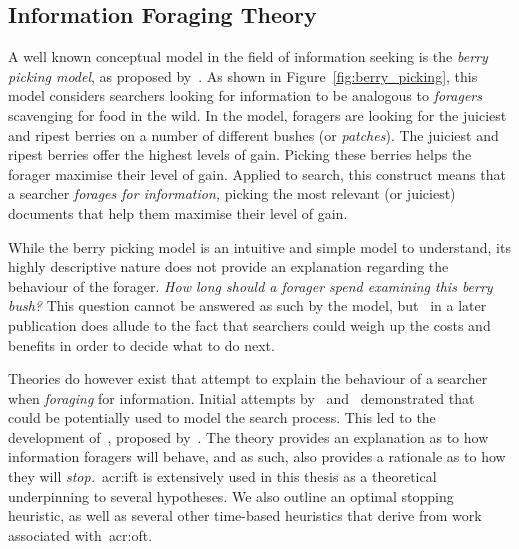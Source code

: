 \subsection{Information Foraging Theory}\label{sec:stopping_background:theoretical:ift}
A well known conceptual model in the field of information seeking is the \emph{berry picking model}, as proposed by~\cite{bates1989berry_picking}. As shown in Figure~\ref{fig:berry_picking}, this model considers searchers looking for information to be analogous to \emph{foragers} scavenging for food in the wild. In the model, foragers are looking for the juiciest and ripest berries on a number of different bushes (or \emph{patches}). The juiciest and ripest berries offer the highest levels of gain. Picking these berries helps the forager maximise their level of gain. Applied to search, this construct means that a searcher \emph{forages for information,} picking the most relevant (or juiciest) documents that help them maximise their level of gain.

While the berry picking model is an intuitive and simple model to understand, its highly descriptive nature does not provide an explanation regarding the behaviour of the forager. \emph{How long should a forager spend examining this berry bush?} This question cannot be answered as such by the model, but~\cite{bates1989alluding} in a later publication does allude to the fact that searchers could weigh up the costs and benefits in order to decide what to do next.

Theories do however exist that attempt to explain the behaviour of a searcher when \emph{foraging} for information. Initial attempts by~\cite{russell1993sense_making} and~\cite{sandstrom1994optimal_foraging} demonstrated that~~\citep{stephens1986foraging_theory} could be potentially used to model the search process. This led to the development of~, proposed by~\cite{pirolli1999ift}. The theory provides an explanation as to how information foragers will behave, and as such, also provides a rationale as to how they will \emph{stop.}~\gls{acr:ift} is extensively used in this thesis as a theoretical underpinning to several hypotheses. We also outline an optimal stopping heuristic, as well as several other time-based heuristics that derive from work associated with~\gls{acr:oft}.

